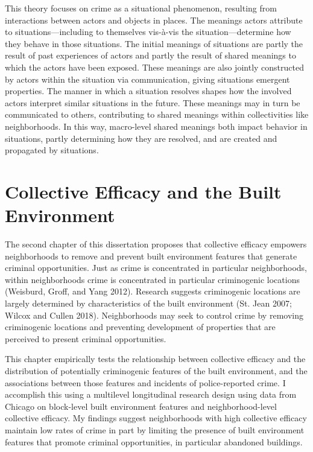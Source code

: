 \documentclass [11pt, proquest] {uwthesis}[2015/03/03]
\begin{document}
This theory focuses on crime as a situational phenomenon, resulting from interactions between actors and objects in places. The meanings actors attribute to situations---including to themselves vis-à-vis the situation---determine how they behave in those situations. The initial meanings of situations are partly the result of past experiences of actors and partly the result of shared meanings to which the actors have been exposed. These meanings are also jointly constructed by actors within the situation via communication, giving situations emergent properties. The manner in which a situation resolves shapes how the involved actors interpret similar situations in the future. These meanings may in turn be communicated to others, contributing to shared meanings within collectivities like neighborhoods. In this way, macro-level shared meanings both impact behavior in situations, partly determining how they are resolved, and are created and propagated by situations.

\hypertarget{collective-efficacy-and-the-built-environment}{%
\section{Collective Efficacy and the Built Environment}\label{collective-efficacy-and-the-built-environment}}

The second chapter of this dissertation proposes that collective efficacy empowers neighborhoods to remove and prevent built environment features that generate criminal opportunities. Just as crime is concentrated in particular neighborhoods, within neighborhoods crime is concentrated in particular criminogenic locations (Weisburd, Groff, and Yang 2012). Research suggests criminogenic locations are largely determined by characteristics of the built environment (St. Jean 2007; Wilcox and Cullen 2018). Neighborhoods may seek to control crime by removing criminogenic locations and preventing development of properties that are perceived to present criminal opportunities.

This chapter empirically tests the relationship between collective efficacy and the distribution of potentially criminogenic features of the built environment, and the associations between those features and incidents of police-reported crime. I accomplish this using a multilevel longitudinal research design using data from Chicago on block-level built environment features and neighborhood-level collective efficacy. My findings suggest neighborhoods with high collective efficacy maintain low rates of crime in part by limiting the presence of built environment features that promote criminal opportunities, in particular abandoned buildings.
\end{document}
